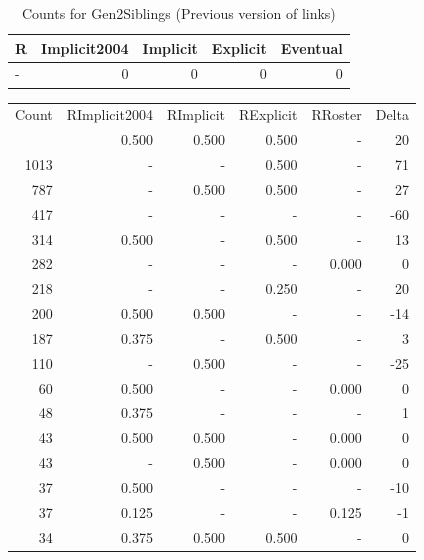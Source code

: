 \documentclass[a4paper]{article}\usepackage{graphicx, color}
\begin{document}
\begin{table}[ht]
\centering
{\large
\begin{tabular}{lrrrr}
  \hline
R & Implicit2004 & Implicit & Explicit & Eventual \\ 
  \hline
- &   0 &   0 &   0 &   0 \\ 
   \hline
\end{tabular}
}
\caption{Counts for Gen2Siblings (Previous version of links)} 
\end{table}



\begin{table}[ht]
\centering
\begin{tabular}{rrrrrr}
  \hline
Count & RImplicit2004 & RImplicit & RExplicit & RRoster & Delta \\ 
  \rowcolor{goodColor}  \hline
1192 & 0.500 & 0.500 & 0.500 & - & 20 \\ 
   \rowcolor{sosoColor} 1013 & - & - & 0.500 & - & 71 \\ 
   \rowcolor{goodColor} 787 & - & 0.500 & 0.500 & - & 27 \\ 
   \rowcolor{nullColor} 417 & - & - & - & - & -60 \\ 
   \rowcolor{sosoColor} 314 & 0.500 & - & 0.500 & - & 13 \\ 
   \rowcolor{nullColor} 282 & - & - & - & 0.000 & 0 \\ 
   \rowcolor{sosoColor} 218 & - & - & 0.250 & - & 20 \\ 
  200 & 0.500 & 0.500 & - & - & -14 \\ 
   \rowcolor{sosoColor} 187 & 0.375 & - & 0.500 & - & 3 \\ 
  110 & - & 0.500 & - & - & -25 \\ 
   \rowcolor{nullColor} 60 & 0.500 & - & - & 0.000 & 0 \\ 
   \rowcolor{nullColor} 48 & 0.375 & - & - & - & 1 \\ 
  43 & 0.500 & 0.500 & - & 0.000 & 0 \\ 
  43 & - & 0.500 & - & 0.000 & 0 \\ 
   \rowcolor{nullColor} 37 & 0.500 & - & - & - & -10 \\ 
   \rowcolor{nullColor} 37 & 0.125 & - & - & 0.125 & -1 \\ 
   \rowcolor{goodColor} 34 & 0.375 & 0.500 & 0.500 & - & 0 \\ 

\end{tabular}
\end{table}
\end{document}

